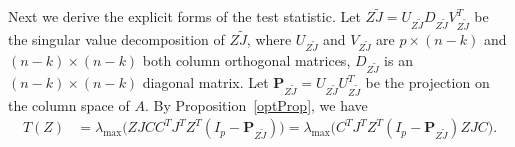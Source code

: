 \documentclass[12pt]{article} %
\newcommand{\bP}{\mathbf{P}}
\theoremstyle{definition}
\begin{document}
Next we derive the explicit forms of the test statistic. 
Let $Z\tilde{J}=U_{Z\tilde{J}}D_{Z\tilde{J}}V_{Z\tilde{J}}^T$ be the singular value decomposition of $Z\tilde{J}$, where $U_{Z\tilde{J}}$ and $V_{Z\tilde{J}}$ are $p\times (n-k)$ and $(n-k)\times(n-k)$ both column orthogonal matrices, $D_{Z\tilde{J}}$ is an $(n-k)\times (n-k)$ diagonal matrix.
Let $\bP_{Z\tilde{J}}=U_{Z\tilde{J}}U_{Z\tilde{J}}^T$ be the projection on the column space of $A$.
By Proposition~\ref{optProp}, we have
\begin{equation}\label{statisticForm1}
\begin{aligned}
    T(Z)&=\lambda_{\max}\big(ZJCC^TJ^TZ^T (I_p-
    \bP_{Z\tilde{J}})
    \big)
    =\lambda_{\max}\big(C^TJ^TZ^T (I_p-
    \bP_{Z\tilde{J}}
    )ZJC\big).
\end{aligned}
\end{equation}
\end{document}
